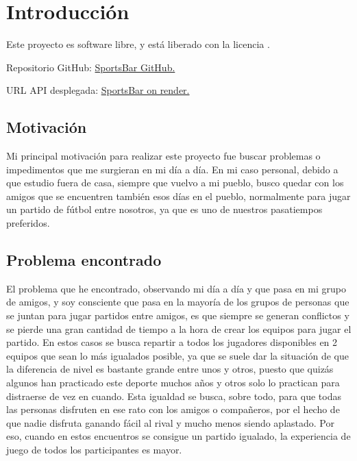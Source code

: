 \chapter{Introducción}

Este proyecto es software libre, y está liberado con la licencia \cite{gplv3}. 

Repositorio GitHub: \href{https://github.com/manujurado1/SportsBar-IV/}{SportsBar GitHub.}

URL API desplegada: \href{https://sports-bar.onrender.com/docs/index.html}{SportsBar on render.}

\section{Motivación}

Mi principal motivación para realizar este proyecto fue buscar problemas o impedimentos que me surgieran en mi día a día.
En mi caso personal, debido a que estudio fuera de casa, siempre que vuelvo a mi pueblo, busco quedar con los amigos que se encuentren también esos días en el pueblo, 
normalmente para jugar un partido de fútbol entre nosotros, ya que es uno de nuestros pasatiempos preferidos.\\

\section{Problema encontrado}

El problema que he encontrado, observando mi día a día y que pasa en mi grupo de amigos, y soy consciente que pasa en la mayoría de los grupos de personas que se juntan para jugar partidos entre amigos, 
es que siempre se generan conflictos y se pierde una gran cantidad de tiempo a la hora de crear los equipos para jugar el partido. 
En estos casos se busca repartir a todos los jugadores disponibles en 2 equipos que sean lo más igualados posible, ya que se suele dar la situación de que la diferencia de nivel es bastante grande entre unos y otros,
puesto que quizás algunos han practicado este deporte muchos años y otros solo lo practican para distraerse de vez en cuando.
Esta igualdad se busca, sobre todo, para que todas las personas disfruten en ese rato con los amigos o compañeros, por el hecho de que nadie disfruta ganando fácil al rival y mucho menos siendo aplastado. Por eso, cuando en estos encuentros se consigue
un partido igualado, la experiencia de juego de todos los participantes es mayor. 

